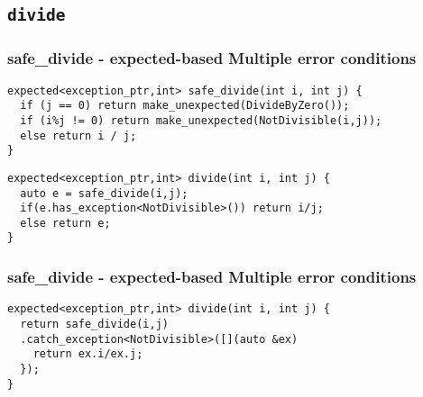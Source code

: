\documentclass[xcolor=dvipsnames]{beamer}
\newcommand{\cpp}[1]{\lstinline{#1}}
\begin{document}
\subsection{\cpp{divide}}
\begin{frame}[fragile]
\frametitle{safe\_divide  - expected-based Multiple error conditions}

\begin{lstlisting}
expected<exception_ptr,int> safe_divide(int i, int j) {
  if (j == 0) return make_unexpected(DivideByZero()); 
  if (i%j != 0) return make_unexpected(NotDivisible(i,j));
  else return i / j; 
}
\end{lstlisting}

\begin{lstlisting}
expected<exception_ptr,int> divide(int i, int j) {
  auto e = safe_divide(i,j);
  if(e.has_exception<NotDivisible>()) return i/j;
  else return e;
}
\end{lstlisting}
\end{frame}
\begin{frame}[fragile]
\frametitle{safe\_divide  - expected-based Multiple error conditions}

\begin{lstlisting}
expected<exception_ptr,int> divide(int i, int j) {
  return safe_divide(i,j)
  .catch_exception<NotDivisible>([](auto &ex)
    return ex.i/ex.j;
  });
}
\end{lstlisting}

\end{frame}
\end{document}
